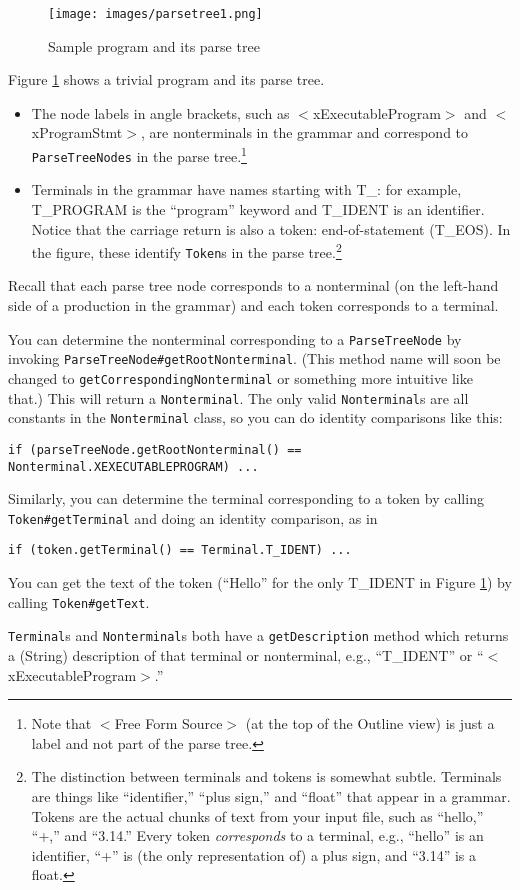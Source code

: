 \begin{figure}[h]
\centering
\texttt{[image: images/parsetree1.png]}
\caption{Sample program and its parse tree}
\label{parsetree}
\end{figure}

Figure \ref{parsetree} shows a trivial program and its parse tree.

\begin{itemize}

\item The node labels in angle brackets, such as $<$xExecutableProgram$>$ and
$<$xProgramStmt$>$, are nonterminals in the grammar and correspond to
\texttt{ParseTreeNodes} in the parse tree.\footnote{Note that $<$Free Form
Source$>$ (at the top of the Outline view) is just a label and not part of
the parse tree.}

\item Terminals in the grammar have names starting with T\_: for example,
T\_PROGRAM is the ``program'' keyword and T\_IDENT is an identifier.
Notice that the carriage return is also a token: end-of-statement (T\_EOS).
In the figure, these identify \texttt{Token}s in the parse
tree.\footnote{The distinction between terminals and tokens is somewhat
subtle.  Terminals are things like ``identifier,'' ``plus sign,'' and
``float'' that appear in a grammar.  Tokens are the actual chunks of text
from your input file, such as ``hello,'' ``+,'' and ``3.14.''  Every token
\textit{corresponds} to a terminal, e.g., ``hello'' is an identifier,
``+'' is (the only representation of) a plus sign, and ``3.14'' is a
float.}

\end{itemize}

Recall that each parse tree node corresponds to a nonterminal (on the
left-hand side of a production in the grammar) and each token corresponds
to a terminal.  

You can determine the nonterminal corresponding to a \texttt{ParseTreeNode}
by invoking \texttt{ParseTreeNode\#getRootNonterminal}.  (This method name
will soon be changed to \texttt{getCorrespondingNonterminal} or something
more intuitive like that.)  This will return a \texttt{Nonterminal}.  The
only valid \texttt{Nonterminal}s are all constants in the \texttt{Nonterminal}
class, so you can do identity comparisons like this:
\begin{verbatim}
if (parseTreeNode.getRootNonterminal() == Nonterminal.XEXECUTABLEPROGRAM) ...
\end{verbatim}

Similarly, you can determine the terminal corresponding to a token by
calling \texttt{Token\#getTerminal} and doing an identity comparison, as in
\begin{verbatim}
if (token.getTerminal() == Terminal.T_IDENT) ...
\end{verbatim}
You can get the text of the token (``Hello'' for the only T\_IDENT in
Figure \ref{parsetree}) by calling \texttt{Token\#getText}.

\texttt{Terminal}s and \texttt{Nonterminal}s both have a
\texttt{getDescription} method which returns a (String) description of that
terminal or nonterminal, e.g., ``T\_IDENT'' or ``$<$xExecutableProgram$>$.''
